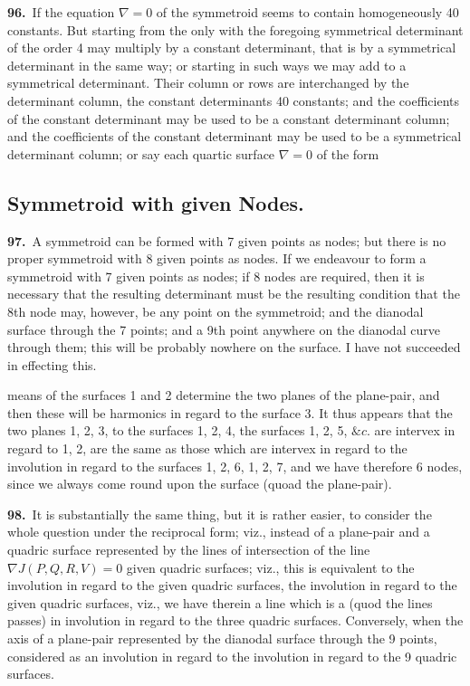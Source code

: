 \documentclass[11pt,a4paper]{article}
\begin{document}
\noindent\textbf{96.}\ If the equation $\nabla = 0$ of the symmetroid seems to contain homogeneously 40 constants. But starting from the only with the foregoing symmetrical determinant of the order 4 may multiply by a constant determinant, that is by a symmetrical determinant in the same way; or starting in such ways we may add to a symmetrical determinant. Their column or rows are interchanged by the determinant column, the constant determinants 40 constants; and the coefficients of the constant determinant may be used to be a constant determinant column; and the coefficients of the constant determinant may be used to be a symmetrical determinant column; or say each quartic surface $\nabla = 0$ of the form

\subsection*{Symmetroid with given Nodes.}

\noindent\textbf{97.}\ A symmetroid can be formed with 7 given points as nodes; but there is no proper symmetroid with 8 given points as nodes. If we endeavour to form a symmetroid with 7 given points as nodes; if 8 nodes are required, then it is necessary that the resulting determinant must be the resulting condition that the 8th node may, however, be any point on the symmetroid; and the dianodal surface through the 7 points; and a 9th point anywhere on the dianodal curve through them; this will be probably nowhere on the surface. I have not succeeded in effecting this.

\newpage
\setcounter{page}{172}

\noindent means of the surfaces 1 and 2 determine the two planes of the plane-pair, and then these will be harmonics in regard to the surface 3. It thus appears that the two planes 1, 2, 3, to the surfaces 1, 2, 4, the surfaces 1, 2, 5, $\&c.$ are intervex in regard to 1, 2, are the same as those which are intervex in regard to the involution in regard to the surfaces 1, 2, 6, 1, 2, 7, and we have therefore 6 nodes, since we always come round upon the surface (quoad the plane-pair).

\medskip

\textbf{98.}\ It is substantially the same thing, but it is rather easier, to consider the whole question under the reciprocal form; viz., instead of a plane-pair and a quadric surface represented by the lines of intersection of the line $\nabla J(P, Q, R, V) = 0$ given quadric surfaces; viz., this is equivalent to the involution in regard to the given quadric surfaces, the involution in regard to the given quadric surfaces, viz., we have therein a line which is a (quod the lines passes) in involution in regard to the three quadric surfaces. Conversely, when the axis of a plane-pair represented by the dianodal surface through the 9 points, considered as an involution in regard to the involution in regard to the 9 quadric surfaces.
\end{document}
